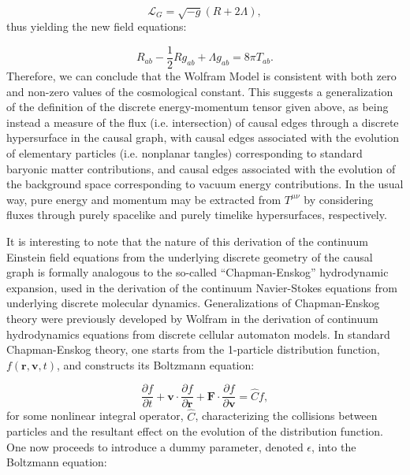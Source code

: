 \documentclass{article}
\begin{document}
\begin{equation}
\mathcal{L}_G = \sqrt{- g} \left( R + 2 \Lambda \right),
\end{equation}
thus yielding the new field equations:

\begin{equation}
R_{a b} - \frac{1}{2} R g_{a b} + \Lambda g_{a b} = 8 \pi T_{a b}.
\end{equation}
Therefore, we can conclude that the Wolfram Model is consistent with both zero and non-zero values of the cosmological constant. This suggests a generalization of the definition of the discrete energy-momentum tensor given above, as being instead a measure of the flux (i.e. intersection) of causal edges through a discrete hypersurface in the causal graph, with causal edges associated with the evolution of elementary particles (i.e. nonplanar tangles) corresponding to standard baryonic matter contributions, and causal edges associated with the evolution of the background space corresponding to vacuum energy contributions. In the usual way, pure energy and momentum may be extracted from ${T^{\mu \nu}}$ by considering fluxes through purely spacelike and purely timelike hypersurfaces, respectively.

It is interesting to note that the nature of this derivation of the continuum Einstein field equations from the underlying discrete geometry of the causal graph is formally analogous to the so-called ``Chapman-Enskog'' hydrodynamic expansion\cite{chapman}\cite{balescu}, used in the derivation of the continuum Navier-Stokes equations from underlying discrete molecular dynamics. Generalizations of Chapman-Enskog theory were previously developed by Wolfram\cite{wolfram7} in the derivation of continuum hydrodynamics equations from discrete cellular automaton models. In standard Chapman-Enskog theory, one starts from the 1-particle distribution function, ${f \left( \mathbf{r}, \mathbf{v}, t \right)}$, and constructs its Boltzmann equation\cite{cercignani}:

\begin{equation}
\frac{\partial f}{\partial t} + \mathbf{v} \cdot \frac{\partial f}{\partial \mathbf{r}} + \mathbf{F} \cdot \frac{\partial f}{\partial \mathbf{v}} = \hat{C} f,
\end{equation}
for some nonlinear integral operator, ${\hat{C}}$, characterizing the collisions between particles and the resultant effect on the evolution of the distribution function. One now proceeds to introduce a dummy parameter, denoted ${\epsilon}$, into the Boltzmann equation:
\end{document}
